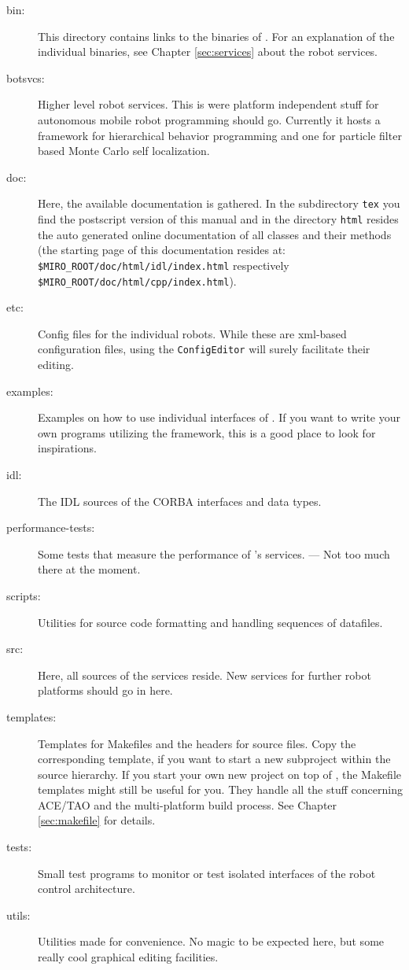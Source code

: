 \documentclass[10pt]{book}
\begin{document}
\begin{description}
\item[bin:]
  This directory contains links to the binaries of \miro.
  For an explanation of the individual binaries, see Chapter
  \ref{sec:services} about the robot services.
\item[botsvcs:] Higher level robot services. This is were platform
  independent stuff for autonomous mobile robot programming should go.
  Currently it hosts a framework for hierarchical behavior programming
  and one for particle filter based Monte Carlo self localization.
\item[doc:]
  Here, the available documentation is gathered. In the
  subdirectory {\tt tex} you find the postscript version of this
  manual and in the directory {\tt html} resides the auto generated
  online documentation of all \miro classes and their methods
  (the starting page of this documentation resides at: \\
  {\tt \$MIRO\_ROOT/doc/html/idl/index.html} respectively \\
  {\tt \$MIRO\_ROOT/doc/html/cpp/index.html}).
\item[etc:] Config files for the individual robots. While these are
  xml-based configuration files, using the {\tt ConfigEditor} will
  surely facilitate their editing.
\item[examples:]
  Examples on how to use individual interfaces of \miro. If you want
  to write your own programs utilizing the \miro framework, this is a
  good place to look for inspirations.
\item[idl:]
  The IDL sources of the CORBA interfaces and data types.
\item[performance-tests:]
  Some tests that measure the performance of \miro's
  services. --- Not too much there at the moment.
\item[scripts:]
  Utilities for source code formatting and handling sequences of
  datafiles.
\item[src:]
  Here, all sources of the \miro services reside. New services for
  further robot platforms should go in here.
\item[templates:]
  Templates for Makefiles and the headers for source files. Copy the
  corresponding template, if you want to start a new subproject within
  the \miro source hierarchy. If you start your own new project on top
  of \miro, the Makefile templates might still be useful for you. They
  handle all the stuff concerning ACE/TAO and the multi-platform build
  process. See Chapter \ref{sec:makefile} for details.
\item[tests:]
  Small test programs to monitor or test isolated interfaces of the
  \miro robot control architecture.
\item[utils:]
  Utilities made for convenience. No magic to be expected here, but some
  really cool graphical editing facilities.
\end{description}
\end{document}

